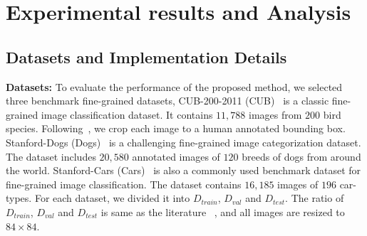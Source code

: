 \documentclass[letterpaper]{article} %
\begin{document}






\section{Experimental results and Analysis}




\subsection{Datasets and Implementation Details}\label{data_imp}
\textbf{Datasets:}
To evaluate the performance of the proposed method, we selected {three} benchmark fine-grained datasets,
CUB-200-2011 (CUB)~\cite{WelinderEtal2010} is a classic fine-grained image classification dataset. It contains $11,788$ images from $200$ bird species. Following~\cite{Zhang_2020_CVPR,Ye_2020_CVPR}, we crop each image to a human annotated bounding box.
Stanford-Dogs (Dogs)~\cite{KhoslaYaoJayadevaprakashFeiFei_FGVC2011} is a challenging fine-grained image categorization dataset. The dataset includes $20,580$ annotated images of $120$ breeds of dogs from around the world.
Stanford-Cars (Cars)~\cite{6755945} is also a commonly used benchmark dataset for fine-grained image classification. The dataset contains $16,185$ images of $196$ car-types.
For each dataset, we divided it into $D_{train}$, $D_{val}$ and $D_{test}$. The ratio of $D_{train}$, $D_{val}$ and $D_{test}$ is same as the literature ~\cite{zhu2020multi}, and all images are resized to $84 \times 84$.
\end{document}
